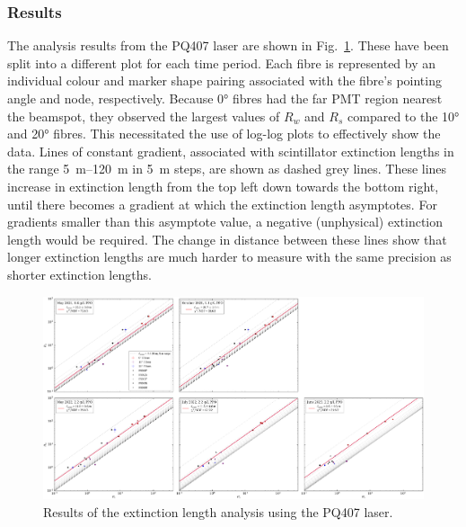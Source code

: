 \subsubsection{Results}\label{sec:smellie_ext_length_results}
The analysis results from the PQ407 laser are shown in Fig.~\ref{fig:smellie_ext_length_results_PQ407}. These have been split into a different plot for each time period. Each fibre is represented by an individual colour and marker shape pairing associated with the fibre's pointing angle and node, respectively. Because \ang{0} fibres had the far PMT region nearest the beamspot, they observed the largest values of $R_{w}$ and $R_{s}$ compared to the \ang{10} and \ang{20} fibres. This necessitated the use of log-log plots to effectively show the data. Lines of constant gradient, associated with scintillator extinction lengths in the range \SIrange{5}{120}{\m} in \SI{5}{\m} steps, are shown as dashed grey lines. These lines increase in extinction length from the top left down towards the bottom right, until there becomes a gradient at which the extinction length asymptotes. For gradients smaller than this asymptote value, a negative (unphysical) extinction length would be required. The change in distance between these lines show that longer extinction lengths are much harder to measure with the same precision as shorter extinction lengths.

\begin{figure}
    \centering
    \includegraphics[width=\textwidth]{5_SMELLIEAnalysis/images/rsrw_plot_combined_PQ405.pdf}
    \caption[Results of the extinction length analysis using the PQ407 laser]
    {Results of the extinction length analysis using the PQ407 laser.}
    \label{fig:smellie_ext_length_results_PQ407}
\end{figure}

